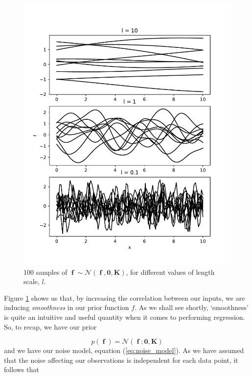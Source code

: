 \documentclass[a4paper, 11pt]{article}
\DeclareMathOperator{\f}{\boldsymbol{f}}
\begin{document}
\begin{figure}[H]
	\centering
	\includegraphics[scale=0.6,trim={0 1cm 0 1cm},clip]{figures/f_prior.pdf}
	\caption{100 samples of $\f \sim \mathcal{N}(\f,\boldsymbol{0},\boldsymbol{K})$, for different values of length scale, $l$.}
	\label{fig:prior_over_f}
\end{figure}
Figure \ref{fig:prior_over_f} shows us that, by increasing the correlation between our inputs, we are inducing \emph{smoothness} in our prior function $f$. As we shall see shortly, `smoothness' is quite an intuitive and useful quantity when it comes to performing regression.\\

So, to recap, we have our prior

\begin{equation}
p(\f) = \mathcal{N}(\f;\boldsymbol{0},\boldsymbol{K})
\end{equation}
and we have our noise model, equation (\ref{eq:noise_model}). As we have assumed that the noise affecting our observations is independent for each data point, it follows that
\end{document}
